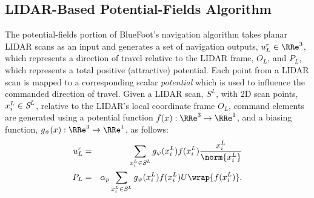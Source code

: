 		\subsection{LIDAR-Based Potential-Fields Algorithm}

			The potential-fields portion of BlueFoot's navigation algorithm takes planar LIDAR scans as an input and generates a set of navigation outputs, ${u}^{r}_{L} \in \RRe^{3}$, which represents a direction of travel relative to the LIDAR frame, $O_{L}$, and $P_{L}$, which represents a total positive (attractive) potential. Each point from a LIDAR scan is mapped to a corresponding scalar \emph{potential} which is used to influence the commanded direction of travel. Given a LIDAR scan, $S^{L}$, with 2D scan points, $x_{i}^{L}\in\emph{S}^{L}$, relative to the LIDAR's local coordinate frame $O_{L}$, command elements are generated using a potential function $f(x) : \RRe^{3}\rightarrow \RRe^{1}$, and a biasing function, $g_{\psi}(x) : \RRe^{3}\rightarrow \RRe^{1}$, as follows:
				\begin{eqnarray}
					{u}^{r}_{L} &=&  { \sum_{x_{i}^{L} \in \emph{S}^{L}} g_{\psi}(x_{i}^{L})  f( x_{i}^{L} ) \frac{x_{i}^{L}}{\norm{x_{i}^{L}}} } \nonumber \\
					P_{L} & = & \alpha_{p}\sum_{x_{i}^{L} \in \emph{S}^{L}} g_{\psi}(x_{i}^{L})  f( x_{i}^{L} ) U\wrap{f( x_{i}^{L} )}.
					\label{eq::full_potential_fields}
				\end{eqnarray}


